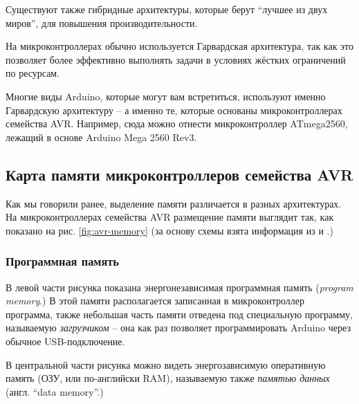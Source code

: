 \documentclass[../sparc.tex]{subfiles}
\begin{document}
Существуют также гибридные архитектуры, которые берут ``лучшее из двух миров'',
для повышения производительности.

На микроконтроллерах обычно используется Гарвардская архитектура, так как это
позволяет более эффективно выполнять задачи в условиях жёстких ограничений по
ресурсам.

Многие виды Arduino, которые могут вам встретиться, используют именно
Гарвардскую архитектуру -- а именно те, которые основаны микроконтроллерах
семейства AVR.  Например, сюда можно отнести микроконтроллер ATmega2560, лежащий
в основе Arduino Mega 2560 Rev3.\cite{arduino:memory-guide}

\subsection{Карта памяти микроконтроллеров семейства AVR}





Как мы говорили ранее, выделение памяти различается в разных архитектурах.  На
микроконтроллерах семейства AVR размещение памяти выглядит так, как показано на
рис. \ref{fig:avr-memory} (за основу схемы взята информация из
\cite{arduino:memory-guide} и \cite{avr:atmega328p-datasheet}.)

\subsubsection{Программная память}

В левой части рисунка показана энергонезависимая программная память
(\emph{program memory}.)  В этой памяти располагается записанная в
микроконтроллер программа, также небольшая часть памяти отведена под специальную
программу, называемую \emph{загрузчиком} -- она как раз позволяет программировать
Arduino через обычное USB-подключение.

В центральной части рисунка можно видеть энергозависимую оперативную память
(\gls{ОЗУ}, или по-английски \gls{RAM}), называемую также \emph{памятью данных}
(англ. ``data memory''.)
\end{document}
